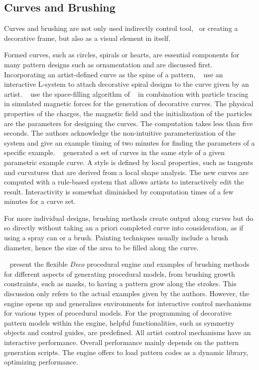 

\subsection{Curves and Brushing}
\label{subsec:analysis_curves}

Curves and brushing are not only used indirectly control tool, \eg~or creating a decorative frame, but also as a visual element in itself. 

Formed curves, such as circles, spirals or hearts, are essential components for many pattern designs such as ornamentation and are discussed first. Incorporating an artist-defined curve as the spine of a pattern, \citeauthor*{yu_2012_ans}~\cite{yu_2012_ans} use an interactive L-system to attach decorative spiral designs to the curve given by an artist. \citeauthor*{xu_2009_mcc}~\cite{xu_2009_mcc} use the space-filling algorithm of \citeauthor*{wong_1998_cgf}~\cite{wong_1998_cgf} in combination with particle tracing in simulated magnetic forces for the generation of decorative curves. The physical properties of the charges, the magnetic field and the initialization of the particles are the parameters for designing the curves. The computation takes less than five seconds. The authors acknowledge the non-intuitive parameterization of the system and give an example timing of two minutes for finding the parameters of a specific example. \citeauthor*{merrell_2010_ecs}~\cite{merrell_2010_ecs} generated a set of curves in the same style of a given parametric example curve. A style is defined by local properties, such as tangents and curvatures that are derived from a local shape analysis. The new curves are computed with a rule-based system that allows artists to interactively edit the result. Interactivity is somewhat diminished by computation times of a few minutes for a curve set.

For more individual designs, brushing methods create output along curves but do so directly without taking an a priori completed curve into consideration, as if using a spray can or a brush. Painting techniques usually include a brush diameter, hence the size of the area to be filled along the curve. 

\citeauthor*{mech_2012_tdf}~\cite{mech_2012_tdf} present the flexible \textit{Deco} procedural engine and examples of brushing methods for different aspects of generating procedural models, from brushing growth constraints, such as masks, to having a pattern grow along the strokes. This discussion only refers to the actual examples given by the authors. However, the engine opens up and generalizes environments for interactive control mechanisms for various types of procedural models. For the programming of decorative pattern models within the engine, helpful functionalities, such as symmetry objects and control guides, are predefined. All artist control mechanisms have an interactive performance. Overall performance mainly depends on the pattern generation scripts. The engine offers to load pattern codes as a dynamic library, optimizing performance. 

